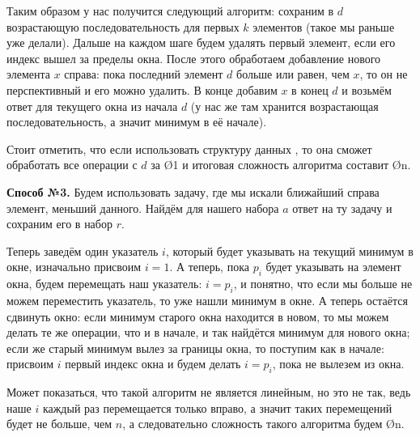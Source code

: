 Таким образом у нас получится следующий алгоритм: сохраним в $d$ возрастающую последовательность для первых $k$ элементов (такое мы раньше уже делали). Дальше на каждом шаге будем удалять первый элемент, если его индекс вышел за пределы окна. После этого обработаем добавление нового элемента $x$ справа: пока последний элемент $d$ больше или равен, чем $x$, то он не перспективный и его можно удалить. В конце добавим $x$ в конец $d$ и возьмём ответ для текущего окна из начала $d$ (у нас же там хранится возрастающая последовательность, а значит минимум в её начале).

Стоит отметить, что если использовать структуру данных , то она сможет обработать все операции с $d$ за \O{1} и итоговая сложность алгоритма составит \O{n}.

\textbf{Способ №3.} Будем использовать задачу, где мы искали ближайший справа элемент, меньший данного. Найдём для нашего набора $a$ ответ на ту задачу и сохраним его в набор $r$.

Теперь заведём один указатель $i$, который будет указывать на текущий минимум в окне, изначально присвоим $i = 1$. А теперь, пока $p_i$ будет указывать на элемент окна, будем перемещать наш указатель: $i = p_i$, и понятно, что если мы больше не можем переместить указатель, то уже нашли минимум в окне. А теперь остаётся сдвинуть окно: если минимум старого окна находится в новом, то мы можем делать те же операции, что и в начале, и так найдётся минимум для нового окна; если же старый минимум вылез за границы окна, то поступим как в начале: присвоим $i$ первый индекс окна и будем делать $i = p_i$, пока не вылезем из окна.

Может показаться, что такой алгоритм не является линейным, но это не так, ведь наше $i$ каждый раз перемещается только вправо, а значит таких перемещений будет не больше, чем $n$, а следовательно сложность такого алгоритма будем \O{n}.
